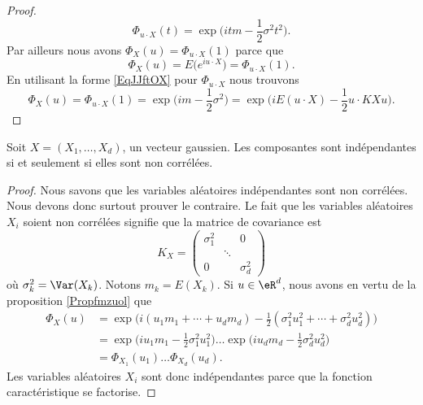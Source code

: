 \begin{proof}
    \begin{equation}    \label{EqJJftOX}
        \Phi_{u\cdot X}(t)=\exp\big( itm-\frac{ 1 }{2}\sigma^2t^2 \big).
    \end{equation}
    Par ailleurs nous avons \( \Phi_X(u)=\Phi_{u\cdot X}(1)\) parce que
    \begin{equation}
        \Phi_X(u)=E\big(  e^{iu\cdot X} \big)=\Phi_{u\cdot X}(1).
    \end{equation}
    En utilisant la forme \eqref{EqJJftOX} pour \( \Phi_{u\cdot X}\) nous trouvons
    \begin{equation}
        \Phi_X(u)=\Phi_{u\cdot X}(1)=\exp\big( im-\frac{ 1 }{2}\sigma^2 \big)=\exp\Big( iE(u\cdot X)-\frac{ 1 }{2}u\cdot KXu \Big).
    \end{equation}
\end{proof}

\begin{theorem} \label{ThoPRkxPdQ}
    Soit \( X=(X_1,\ldots, X_d)\), un vecteur gaussien. Les composantes sont indépendantes si et seulement si elles sont non corrélées.
\end{theorem}

\begin{proof}
    Nous savons que les variables aléatoires indépendantes sont non corrélées. Nous devons donc surtout prouver le contraire. Le fait que les variables aléatoires \( X_i\) soient non corrélées signifie que la matrice de covariance est
    \begin{equation}
        K_X=\begin{pmatrix}
            \sigma_1^2    &       &   0    \\
                &   \ddots    &       \\
            0    &       &   \sigma_d^2
        \end{pmatrix}
    \end{equation}
    où \( \sigma_k^2=\Var(X_k)\). Notons \( m_k=E(X_k)\). Si \( u\in \eR^d\), nous avons en vertu de la proposition \ref{Propfmzuol} que
    \begin{subequations}
        \begin{align}
            \Phi_X(u)&=\exp\Big( i(u_1m_1+\cdots +u_dm_d)-\frac{ 1 }{2}(\sigma_1^2u_1^2+\cdots +\sigma_d^2u_d^2) \Big)\\
            &=\exp\big( iu_1m_1-\frac{ 1 }{2}\sigma_1^2u_1^2 \big)\ldots\exp\big( iu_dm_d-\frac{ 1 }{2}\sigma_d^2u_d^2 \big)\\
            &=\Phi_{X_1}(u_1)\ldots \Phi_{X_d}(u_d).
        \end{align}
    \end{subequations}
    Les variables aléatoires \( X_i\) sont donc indépendantes parce que la fonction caractéristique se factorise.
\end{proof}

